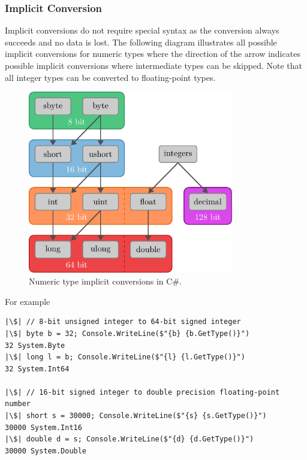 \documentclass{article}
\begin{document}
\subsubsection{Implicit Conversion}
Implicit conversions do not require special syntax as the conversion
always succeeds and no data is lost. The following diagram illustrates
all possible implicit conversions for numeric types where the direction
of the arrow indicates possible implicit conversions where intermediate
types can be skipped. Note that all integer types can be converted to
floating-point types.
\begin{figure}[H]
    \centering
    \includegraphics[height = 8cm, keepaspectratio = true]{figures/implicit_conversions.pdf}
    \caption{Numeric type implicit conversions in C\#.}
\end{figure}
For example
\begin{verbatim}
|\$| // 8-bit unsigned integer to 64-bit signed integer
|\$| byte b = 32; Console.WriteLine($"{b} {b.GetType()}")
32 System.Byte
|\$| long l = b; Console.WriteLine($"{l} {l.GetType()}")
32 System.Int64

|\$| // 16-bit signed integer to double precision floating-point number
|\$| short s = 30000; Console.WriteLine($"{s} {s.GetType()}")
30000 System.Int16
|\$| double d = s; Console.WriteLine($"{d} {d.GetType()}")
30000 System.Double
\end{verbatim}
\end{document}
